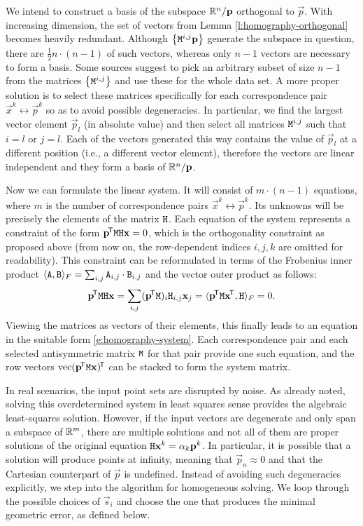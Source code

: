 We intend to construct a basis of the subspace $\mathbb{R}^n / \mathbf{p}$ orthogonal to $\vec p$.
With increasing dimension, the set of vectors from Lemma \ref{l:homography-orthogonal} becomes heavily redundant.
Although $\left\{ \mathtt{M}^{i, j} \mathbf{p} \right\}$ generate the subspace in question, there are $\frac {1} {2} n \cdot (n - 1)$ of such vectors, whereas only $n-1$ vectors are necessary to form a basis.
Some sources suggest to pick an arbitrary subset of size $n - 1$ from the matrices $\left\{ \mathtt{M}^{i, j} \right\}$ and use these for the whole data set.\cite{hartley03}
A more proper solution is to select these matrices specifically for each correspondence pair $\vec x^k \leftrightarrow \vec p^k$ so as to avoid possible degeneracies.
In particular, we find the largest vector element $\vec p_l$ (in absolute value) and then select all matrices $\mathtt{M}^{i, j}$ such that $i = l$ or $j = l$.
Each of the vectors generated this way contains the value of $\vec p_l$ at a different position (i.e., a different vector element), therefore the vectors are linear independent and they form a basis of $\mathbb{R}^n / \mathbf{p}$.

Now we can formulate the linear system.
It will consist of $m \cdot (n - 1)$ equations, where $m$ is the number of correspondence pairs $\vec x^k \leftrightarrow \vec p^k$.
Its unknowns will be precisely the elements of the matrix $\mathtt{H}$.
Each equation of the system represents a constraint of the form $\mathbf{p}^{\!\mathsf{T}} \mathtt{M} \mathtt{H} \mathbf{x} = 0$, which is the orthogonality constraint as proposed above (from now on, the row-dependent indices $i, j, k$ are omitted for readability).
This constraint can be reformulated in terms of the Frobenius inner product $\langle \mathtt{A}, \mathtt{B} \rangle_F = \sum_{i, j} \mathtt{A}_{i, j} \cdot \mathtt{B}_{i, j}$ and the vector outer product as follows:
$$\mathbf{p}^{\!\mathsf{T}} \mathtt{M} \mathtt{H} \mathbf{x} = \sum_{i, j} (\mathbf{p}^{\!\mathsf{T}} \mathtt{M})_i \mathtt{H}_{i, j} \mathbf{x}_j = \langle \mathbf{p}^{\!\mathsf{T}} \mathtt{M} \mathbf{x}^{\!\mathsf{T}}, \mathtt{H} \rangle_F = 0.$$
Viewing the matrices as vectors of their elements, this finally leads to an equation in the suitable form \eqref{e:homography-system}.
Each correspondence pair and each selected antisymmetric matrix $\mathtt{M}$ for that pair provide one such equation, and the row vectors $\mathrm{vec} ({\mathbf{p}}^{\!\mathsf{T}} \mathtt{M} \mathbf{x})^{\!\mathsf{T}}$ can be stacked to form the system matrix.

In real scenarios, the input point sets are disrupted by noise.
As already noted, solving this overdetermined system in least squares sense provides the algebraic least-squares solution.
However, if the input vectors are degenerate and only span a subspace of $\mathbb{R}^m$, there are multiple solutions and not all of them are proper solutions of the original equation $\mathtt{H} \mathbf{x}^k = \alpha_k \mathbf{p}^k$.
In particular, it is possible that a solution will produce points at infinity, meaning that $\vec p_n \approx 0$ and that the Cartesian counterpart of $\vec p$ is undefined.
Instead of avoiding such degeneracies explicitly, we step into the algorithm for homogeneous solving.
We loop through the possible choices of $\vec s_i$ and choose the one that produces the minimal geometric error, as defined below.

